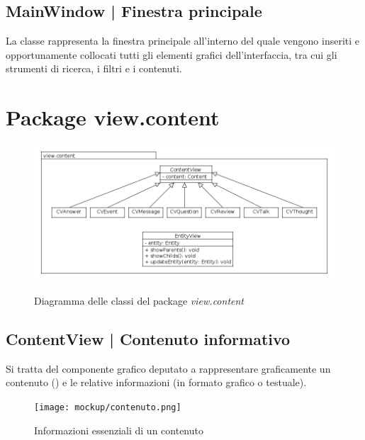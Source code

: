 \documentclass[10pt,a4paper,headinclude,footinclude,hidelinks]{scrreprt} %
\begin{document}
	\subsection[MainWindow]{MainWindow | Finestra principale}
	\label{sec:stage:design:view:window}
	La classe \textit{} rappresenta la finestra principale all'interno del quale vengono inseriti e opportunamente collocati tutti gli elementi grafici dell'interfaccia, tra cui gli strumenti di ricerca, i filtri e i contenuti.

	\section{Package view.content}
	\label{sec:stage:design:view.content}

	\begin{figure}[ht]
		\begin{center}
	    	\includegraphics[width=12cm]{class/view_content.png}
			\label{gfx:class:view:content}
			\caption{Diagramma delle classi del package \textit{view.content}}
		\end{center}
	\end{figure}

	\subsection[ContentView]{ContentView | Contenuto informativo}
	\label{sec:stage:design:view:content-widget}
	Si tratta del componente grafico deputato a rappresentare graficamente un contenuto (\textit{}) e le relative informazioni (in formato grafico o testuale).

	\begin{figure}[ht]
		\begin{center}
	    	\texttt{[image: mockup/contenuto.png]}
			\label{gfx:mockup:content}
			\caption{Informazioni essenziali di un contenuto}
		\end{center}
	\end{figure}
\end{document}
